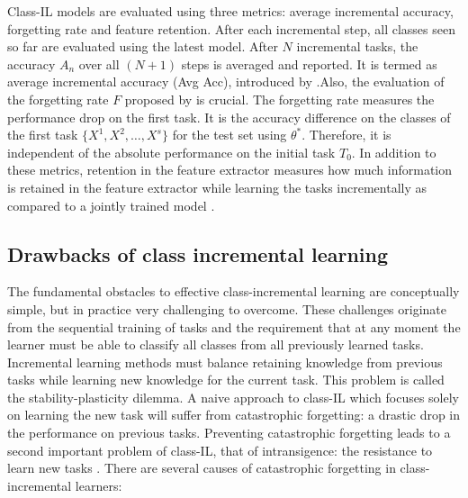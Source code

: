 \documentclass{article}
\begin{document}
Class-IL models are evaluated using three metrics: average incremental accuracy, forgetting rate and feature retention. After each incremental step, all classes seen so far are evaluated using the latest model. After $N$ incremental tasks, the accuracy $A_n$ over all $(N + 1)$ steps is averaged and reported. It is termed as average incremental accuracy (Avg Acc), introduced by \cite{rebuffi2017icarl}.Also, the evaluation of the forgetting rate $F$ proposed by \cite{liu2020generative} is crucial. The forgetting rate measures the performance drop on the first task. It is the accuracy difference on the classes of the first task $\{X^1,X^2, \ldots, X^s\}$ for the test set using $\theta^ * $. Therefore, it is independent
of the absolute performance on the initial task $T_0$. In addition to these metrics, retention in the feature extractor measures how much information is retained in the feature extractor while learning the
tasks incrementally as compared to a jointly trained model \cite{mittal2021essentials}.

\subsection{Drawbacks of class incremental learning }

The fundamental obstacles to effective class-incremental
learning are conceptually simple, but in practice very challenging to overcome. These challenges originate from the sequential training of tasks and the requirement that at any
moment the learner must be able to classify all classes from
all previously learned tasks. Incremental learning methods must balance retaining knowledge from previous tasks
while learning new knowledge for the current task. This
problem is called the stability-plasticity dilemma. A naive
approach to class-IL which focuses solely on learning the
new task will suffer from catastrophic forgetting: a drastic
drop in the performance on previous tasks. Preventing catastrophic forgetting leads to a second important
problem of class-IL, that of intransigence: the resistance to
learn new tasks . There are several causes of catastrophic
forgetting in class-incremental learners:
\end{document}
